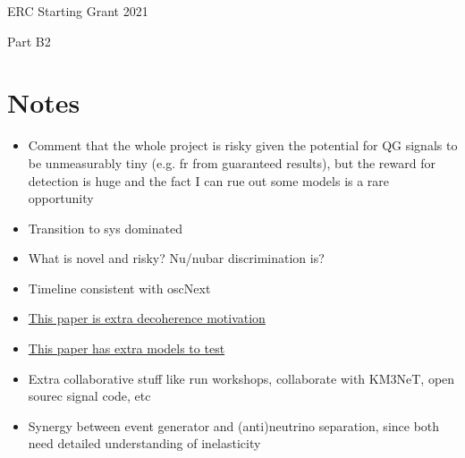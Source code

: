 \documentclass[a4paper,11pt]{article}
\newcommand\BackImage[2][scale=1]{%
\BgThispage
\backgroundsetup{
  contents={\texttt{[image: \#2]}}
  }
}
\newcounter{bar}
\begin{document}

\renewcommand{\headrulewidth}{0pt}

\pagestyle{fancyplain}


\centerline{\huge ERC Starting Grant 2021}
\centerline{\huge Part B2}

\vspace{0.5cm}
%
%
  


\section{Notes}
\vspace{0.1 cm}

\begin{itemize}
    \item Comment that the whole project is risky given the potential for QG signals to be unmeasurably tiny (e.g. fr from guaranteed results), but the reward for  detection is huge and the fact I can rue out some models is a rare opportunity
    \item Transition to sys dominated
    \item What is novel and risky? Nu/nubar discrimination is?
    \item Timeline consistent with oscNext
    \item \href{https://arxiv.org/pdf/2103.11984.pdf}{This paper is extra decoherence motivation}
    \item \href{https://arxiv.org/pdf/0806.0339.pdf}{This paper has extra models to test}
    \item Extra collaborative stuff like run workshops, collaborate with KM3NeT, open sourec signal code, etc
    \item Synergy between event generator and (anti)neutrino separation, since both need detailed understanding of inelasticity
\end{itemize}
\end{document}
